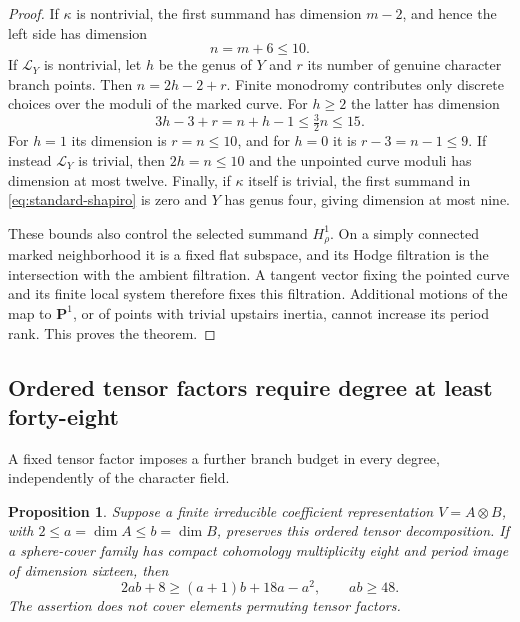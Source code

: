 \documentclass[11pt]{article}
\newtheorem{proposition}[theorem]{Proposition}
\theoremstyle{definition}
\theoremstyle{remark}
\begin{document}
\begin{proof}
If $\kappa$ is nontrivial, the first summand has dimension $m-2$,
and hence the left side has dimension
\[
 n=m+6\le10.
\]
If $\mathcal L_Y$ is nontrivial, let $h$ be the genus of $Y$ and
$r$ its number of genuine character branch points. Then
$n=2h-2+r$. Finite monodromy contributes only discrete choices
over the moduli of the marked curve. For $h\ge2$ the latter has
dimension
\[
 3h-3+r=n+h-1\le\tfrac32n\le15.
\]
For $h=1$ its dimension is $r=n\le10$, and for $h=0$ it is
$r-3=n-1\le9$. If instead $\mathcal L_Y$ is trivial, then
$2h=n\le10$ and the unpointed curve moduli has dimension at most
twelve. Finally, if $\kappa$ itself is trivial, the first summand
in \eqref{eq:standard-shapiro} is zero and $Y$ has genus four,
giving dimension at most nine.

These bounds also control the selected summand $H^1_\rho$.
On a simply connected marked neighborhood it is a fixed flat
subspace, and its Hodge filtration is the intersection with the
ambient filtration. A tangent vector fixing the pointed curve
and its finite local system therefore fixes this filtration.
Additional motions of the map to $\mathbf P^1$, or of points
with trivial upstairs inertia, cannot increase its period rank.
This proves the theorem.
\end{proof}


\subsection{Ordered tensor factors require degree at least forty-eight}

A fixed tensor factor imposes a further branch budget in every degree,
independently of the character field.

\begin{proposition}\label{prop:ordered-tensor48}
Suppose a finite irreducible coefficient representation
$V=A\otimes B$, with $2\le a=\dim A\le b=\dim B$, preserves this
ordered tensor decomposition.  If a sphere-cover family has compact
cohomology multiplicity eight and period image of dimension sixteen,
then
\[
 2ab+8\ge(a+1)b+18a-a^2,\qquad ab\ge48.
\]
The assertion does not cover elements permuting tensor factors.
\end{proposition}
\end{document}
